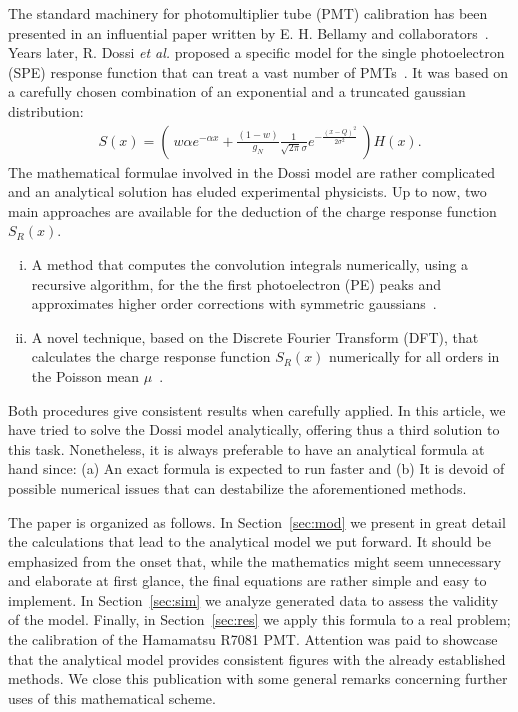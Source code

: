 \documentclass[preprint,12pt]{elsarticle}
\begin{document}
The standard machinery for photomultiplier tube (PMT) calibration has been presented in an influential paper written by E. H. Bellamy and collaborators~\cite{bellamy}. 
Years later, R. Dossi \emph{et al.} proposed a specific model for the single photoelectron (SPE) response function that can treat a vast number of PMTs~\cite{dossi}. 
It was based on a carefully chosen combination of an exponential and a truncated gaussian distribution:
\begin{align}
S(x) =    \left( \ w \alpha e^{-\alpha x } + \frac{(1-w)}{g_N} \frac{1}{\sqrt{2\pi}\sigma} e^{ - \frac{( x - Q )^2}{2\sigma^2}} \ \right) H(x).       \label{eq:S}
\end{align}
The mathematical formulae involved in the Dossi model are rather complicated and an analytical solution has eluded experimental physicists. 
Up to now, two main approaches are available for the deduction of the charge response function $S_R(x)$.
\begin{enumerate}[i.]
\item  A method that computes the convolution integrals numerically, using a recursive algorithm, 
for the the first photoelectron (PE) peaks and approximates higher order corrections with symmetric gaussians~\cite{dossi}. 
\item A novel technique, based on the Discrete Fourier Transform (DFT), that calculates the charge response function $S_R(x)$ numerically for all orders in the Poisson mean $\mu$~\cite{me}. 
\end{enumerate}
Both procedures give consistent results when carefully applied. 
In this article, we have tried to solve the Dossi model analytically, offering thus a third solution to this task. 
Nonetheless, it is always preferable to have an analytical formula at hand since: 
(a) An exact formula is expected to run faster and 
(b) It is devoid of possible numerical issues that can destabilize the aforementioned methods.  

The paper is organized as follows. 
In Section~\ref{sec:mod} we present in great detail the calculations that lead to the analytical model we put forward. 
It should be emphasized from the onset that, while the mathematics might seem unnecessary and elaborate at first glance, the final equations are rather simple and easy to implement. 
In Section~\ref{sec:sim} we analyze generated data to assess the validity of the model. 
Finally, in Section~\ref{sec:res} we apply this formula to a real problem; the calibration of the Hamamatsu R7081 PMT. 
Attention was paid to showcase that the analytical model provides consistent figures with the already established methods. 
We close this publication with some general remarks concerning further uses of this mathematical scheme. 
\end{document}
